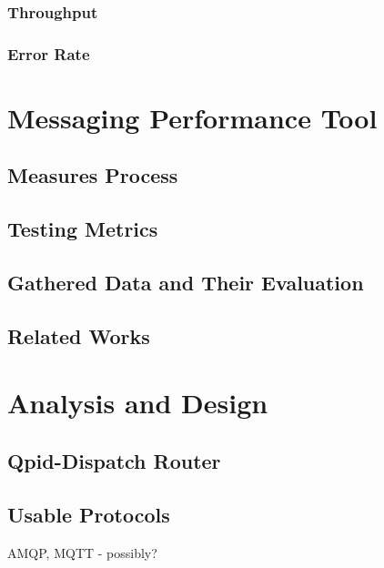 \subsection{Throughput}

\subsection{Error Rate}

\chapter{Messaging Performance Tool}
\label{Messaging Performance Tool}

\section{Measures Process}
\label{Measures Process}

\section{Testing Metrics}
\label{Testing Metrics}

\section{Gathered Data and Their Evaluation}
\label{Gathered Data and Their Evaluation}

\section{Related Works}
\label{Related Works}

\chapter{Analysis and Design}
\label{Analysis and Design}

\section{Qpid-Dispatch Router}

\section{Usable Protocols}
AMQP, MQTT - possibly?


